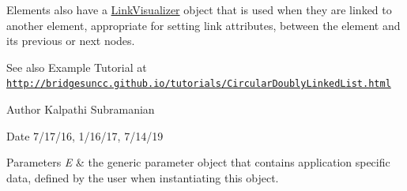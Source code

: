 Elements also have a \mbox{\hyperlink{classbridges_1_1base_1_1_link_visualizer}{Link\+Visualizer}} object that is used when they are linked to another element, appropriate for setting link attributes, between the element and its previous or next nodes.

\begin{DoxySeeAlso}{See also}
Example Tutorial at \href{http://bridgesuncc.github.io/tutorials/CircularDoublyLinkedList.html}{\tt http\+://bridgesuncc.\+github.\+io/tutorials/\+Circular\+Doubly\+Linked\+List.\+html}
\end{DoxySeeAlso}
\begin{DoxyAuthor}{Author}
Kalpathi Subramanian
\end{DoxyAuthor}
\begin{DoxyDate}{Date}
7/17/16, 1/16/17, 7/14/19
\end{DoxyDate}

\begin{DoxyParams}{Parameters}
{\em E} & the generic parameter object that contains application specific data, defined by the user when instantiating this object. \\
\hline
\end{DoxyParams}
